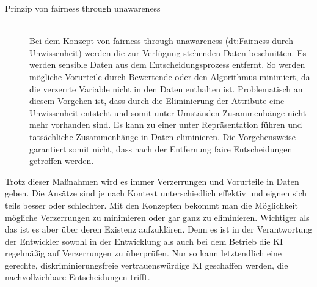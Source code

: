 \begin{onehalfspace}
\begin{description}
\begin{description}
                \item[Prinzip von \glqq{}fairness through unawareness\grqq{}] \hfill \\
                Bei dem Konzept von \glqq{}fairness through unawareness\grqq{} (\ac*{dt}:Fairness durch Unwissenheit) werden die zur Verfügung stehenden Daten beschnitten. Es werden sensible Daten aus dem Entscheidungsprozess entfernt. So werden mögliche Vorurteile durch Bewertende oder den Algorithmus minimiert, da die verzerrte Variable nicht in den Daten enthalten ist. Problematisch an diesem Vorgehen ist, dass durch die Eliminierung der Attribute eine Unwissenheit entsteht und somit unter Umständen Zusammenhänge nicht mehr vorhanden sind. Es kann zu einer unter Repräsentation führen und tatsächliche Zusammenhänge in Daten eliminieren. Die Vorgehensweise garantiert somit nicht, dass nach der Entfernung faire Entscheidungen getroffen werden.\cite{hagendorff2019maschinelles}

            \end{description}
            
        \end{description}
        Trotz dieser Maßnahmen wird es immer Verzerrungen und Vorurteile in Daten geben. Die Ansätze sind je nach Kontext unterschiedlich effektiv und eignen sich teils besser oder schlechter. Mit den Konzepten bekommt man die Möglichkeit mögliche Verzerrungen zu minimieren oder gar ganz zu eliminieren. Wichtiger als das ist es aber über deren Existenz aufzuklären. Denn es ist in der Verantwortung der Entwickler sowohl in der Entwicklung als auch bei dem Betrieb die \ac*{KI} regelmäßig auf Verzerrungen zu überprüfen.\cite{Drew2019} Nur so kann letztendlich eine gerechte, diskriminierungsfreie vertrauenswürdige \ac*{KI} geschaffen werden, die nachvollziehbare Entscheidungen trifft.\cite{HEGKI2019}\cite{HEGKI2019Definition}\cite{Fabi2022}
        
    \newpage
\end{onehalfspace}
